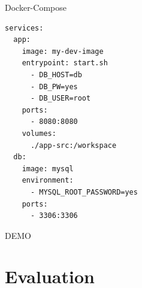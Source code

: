 \documentclass{beamer}
\begin{document}
\begin{frame}[fragile]{Docker-Compose}
  \begin{lstlisting}[language=docker-compose-2,basicstyle=\scriptsize,caption={Exemplary docker-compose.yml file},breaklines=true,label={code::compose_example}]
services:
  app:
    image: my-dev-image
    entrypoint: start.sh
      - DB_HOST=db
      - DB_PW=yes
      - DB_USER=root
    ports:
      - 8080:8080
    volumes:
      ./app-src:/workspace
  db:
    image: mysql
    environment:
      - MYSQL_ROOT_PASSWORD=yes
    ports:
      - 3306:3306
    \end{lstlisting}
\end{frame}


\begin{frame}{}
  \begin{center}
    \Huge \color{uos-red-full} DEMO
  \end{center}
\end{frame}

\section{Evaluation}
\end{document}
